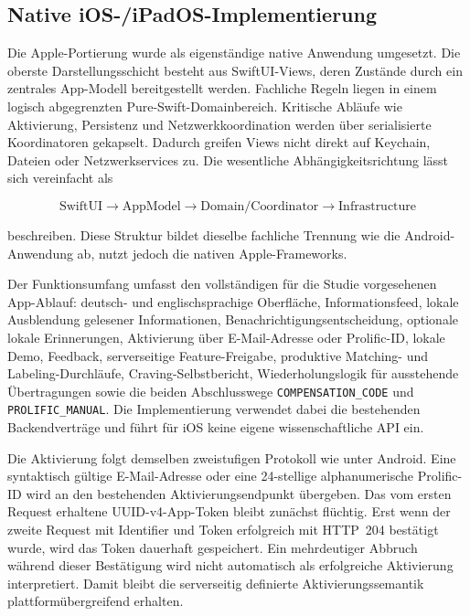
\begin{neu}
\section{Native iOS-/iPadOS-Implementierung}

Die Apple-Portierung wurde als eigenständige native Anwendung umgesetzt. Die oberste Darstellungsschicht besteht aus SwiftUI-Views, deren Zustände durch ein zentrales App-Modell bereitgestellt werden. Fachliche Regeln liegen in einem logisch abgegrenzten Pure-Swift-Domainbereich. Kritische Abläufe wie Aktivierung, Persistenz und Netzwerkkoordination werden über serialisierte Koordinatoren gekapselt. Dadurch greifen Views nicht direkt auf Keychain, Dateien oder Netzwerkservices zu. Die wesentliche Abhängigkeitsrichtung lässt sich vereinfacht als

\[
\text{SwiftUI} \rightarrow \text{AppModel} \rightarrow \text{Domain/Coordinator} \rightarrow \text{Infrastructure}
\]

beschreiben. Diese Struktur bildet dieselbe fachliche Trennung wie die Android-Anwendung ab, nutzt jedoch die nativen Apple-Frameworks.

Der Funktionsumfang umfasst den vollständigen für die Studie vorgesehenen App-Ablauf: deutsch- und englischsprachige Oberfläche, Informationsfeed, lokale Ausblendung gelesener Informationen, Benachrichtigungsentscheidung, optionale lokale Erinnerungen, Aktivierung über E-Mail-Adresse oder Prolific-ID, lokale Demo, Feedback, serverseitige Feature-Freigabe, produktive Matching- und Labeling-Durchläufe, Craving-Selbstbericht, Wiederholungslogik für ausstehende Übertragungen sowie die beiden Abschlusswege \texttt{COMPENSATION\_CODE} und \texttt{PROLIFIC\_MANUAL}. Die Implementierung verwendet dabei die bestehenden Backendverträge und führt für iOS keine eigene wissenschaftliche API ein.

Die Aktivierung folgt demselben zweistufigen Protokoll wie unter Android. Eine syntaktisch gültige E-Mail-Adresse oder eine 24-stellige alphanumerische Prolific-ID wird an den bestehenden Aktivierungsendpunkt übergeben. Das vom ersten Request erhaltene UUID-v4-App-Token bleibt zunächst flüchtig. Erst wenn der zweite Request mit Identifier und Token erfolgreich mit HTTP~204 bestätigt wurde, wird das Token dauerhaft gespeichert. Ein mehrdeutiger Abbruch während dieser Bestätigung wird nicht automatisch als erfolgreiche Aktivierung interpretiert. Damit bleibt die serverseitig definierte Aktivierungssemantik plattformübergreifend erhalten.


\end{neu}
